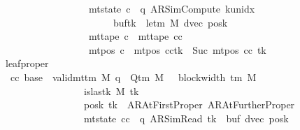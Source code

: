 \begin{isabellebody}
\ \ \ \ \ \ \ \ \ \ \ \ \ \ \ \ \ \ \ \ \ \ \ {\isasymand}\ mt{\isacharunderscore}{\kern0pt}state\ c{\isacharprime}{\kern0pt}{\isacharprime}{\kern0pt}\ {\isacharequal}{\kern0pt}\ {\isacharparenleft}{\kern0pt}q{\isacharcomma}{\kern0pt}\ AR{\isacharunderscore}{\kern0pt}SimCompute{\isacharcomma}{\kern0pt}\ k{\isacharunderscore}{\kern0pt}unidx\ {}{\isacharcomma}{\kern0pt}\ {}{\isacharcomma}{\kern0pt}\isanewline
\ \ \ \ \ \ \ \ \ \ \ \ \ \ \ \ \ \ \ \ \ \ \ \ \ \ \ \ \ buf{\isacharparenleft}{\kern0pt}tk\ {\isacharcolon}{\kern0pt}{\isacharequal}{\kern0pt}\ le{\isacharunderscore}{\kern0pt}tm\ M{\isacharparenright}{\kern0pt}{\isacharcomma}{\kern0pt}\ dvec{\isacharcomma}{\kern0pt}\ posk{\isacharparenright}{\kern0pt}\isanewline
\ \ \ \ \ \ \ \ \ \ \ \ \ \ \ \ \ \ \ \ \ \ \ {\isasymand}\ mt{\isacharunderscore}{\kern0pt}tape\ c{\isacharprime}{\kern0pt}{\isacharprime}{\kern0pt}\ {\isacharequal}{\kern0pt}\ mt{\isacharunderscore}{\kern0pt}tape\ cc\isanewline
\ \ \ \ \ \ \ \ \ \ \ \ \ \ \ \ \ \ \ \ \ \ \ {\isasymand}\ mt{\isacharunderscore}{\kern0pt}pos\ c{\isacharprime}{\kern0pt}{\isacharprime}{\kern0pt}\ {\isacharequal}{\kern0pt}\ {\isacharparenleft}{\kern0pt}mt{\isacharunderscore}{\kern0pt}pos\ cc{\isacharparenright}{\kern0pt}{\isacharparenleft}{\kern0pt}tk\ {\isacharcolon}{\kern0pt}{\isacharequal}{\kern0pt}\ Suc\ {\isacharparenleft}{\kern0pt}mt{\isacharunderscore}{\kern0pt}pos\ cc\ tk{\isacharparenright}{\kern0pt}{\isacharparenright}{\kern0pt}{\isachardoublequoteclose}\isanewline
\ \ \ \ \ \ \ leaf{\isacharunderscore}{\kern0pt}proper{\isacharcolon}{\kern0pt}\isanewline
\ \ \ \ \ \ \ \ {\isachardoublequoteopen}{\isasymAnd}cc\ base{\isacharprime}{\kern0pt}{\isachardot}{\kern0pt}\ {\isasymlbrakk}\ valid{\isacharunderscore}{\kern0pt}mttm\ M{\isacharsemicolon}{\kern0pt}\ q\ {\isasymin}\ Q{\isacharunderscore}{\kern0pt}tm\ M{\isacharsemicolon}{\kern0pt}\ {}\ {\isasymle}\ block{\isacharunderscore}{\kern0pt}width\ {\isacharparenleft}{\kern0pt}{\isasymGamma}{\isacharunderscore}{\kern0pt}tm\ M{\isacharparenright}{\kern0pt}{\isacharsemicolon}{\kern0pt}\isanewline
\ \ \ \ \ \ \ \ \ \ \ \ \ \ \ \ \ \ \ \ \ \ \ is{\isacharunderscore}{\kern0pt}last{\isacharunderscore}{\kern0pt}k\ M\ tk{\isacharsemicolon}{\kern0pt}\isanewline
\ \ \ \ \ \ \ \ \ \ \ \ \ \ \ \ \ \ \ \ \ \ \ posk\ tk\ {\isasymin}\ {\isacharbraceleft}{\kern0pt}AR{\isacharunderscore}{\kern0pt}AtFirstProper{\isacharcomma}{\kern0pt}\ AR{\isacharunderscore}{\kern0pt}AtFurtherProper{\isacharbraceright}{\kern0pt}{\isacharsemicolon}{\kern0pt}\isanewline
\ \ \ \ \ \ \ \ \ \ \ \ \ \ \ \ \ \ \ \ \ \ \ mt{\isacharunderscore}{\kern0pt}state\ cc\ {\isacharequal}{\kern0pt}\ {\isacharparenleft}{\kern0pt}q{\isacharcomma}{\kern0pt}\ AR{\isacharunderscore}{\kern0pt}SimRead{\isacharcomma}{\kern0pt}\ tk{\isacharcomma}{\kern0pt}\ {}{\isacharcomma}{\kern0pt}\ buf{\isacharcomma}{\kern0pt}\ dvec{\isacharcomma}{\kern0pt}\ posk{\isacharparenright}{\kern0pt}{\isacharsemicolon}{\kern0pt}\isanewline

\end{isabellebody}
